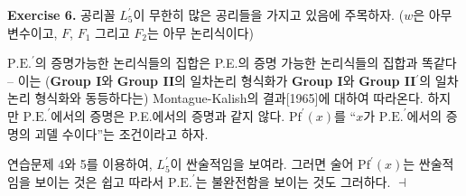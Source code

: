 \documentclass[12pt]{paper}
\newenvironment{context}[1][]
{ \noindent \textbf{{#1}.} }
{ \hfill $ \dashv $ }
\begin{document}
\begin{context}[Exercise 6]
공리꼴 $L_5^{\prime}$이 무한히 많은 공리들을 가지고 있음에 주목하자.
($w$은 아무 변수이고, $F$, $F_1$ 그리고 $F_2$는 아무 논리식이다)

$\mathrm{P.E.}^{\prime}$의 증명가능한 논리식들의 집합은 P.E.의 증명 가능한 논리식들의 집합과 똑같다 --
이는 (\textbf{Group I}와 \textbf{Group II}의 일차논리 형식화가 \textbf{Group I}와 \textbf{Group II}$^{\prime}$의 일차논리 형식화와 동등하다는) Montague-Kalish의 결과[1965]에 대하여 따라온다.
하지만 $\mathrm{P.E.}^{\prime}$에서의 증명은 P.E.에서의 증명과 같지 않다.
$\mathrm{Pf}^{\prime} \left( x \right)$를 ``$x$가 $\mathrm{P.E.}^{\prime}$에서의 증명의 괴델 수이다''는 조건이라고 하자.

연습문제 4와 5를 이용하여, $L_5^{\prime}$이 싼술적임을 보여라.
그러면 술어 $\mathrm{Pf}^{\prime} \left( x \right)$는 싼술적임을 보이는 것은 쉽고
따라서 $\mathrm{P.E.}^{\prime}$는 불완전함을 보이는 것도 그러하다.
\end{context}
\end{document}

